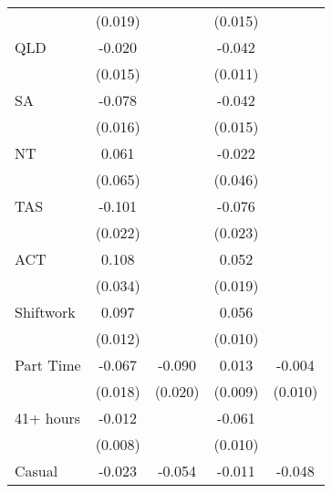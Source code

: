 {\begin{tabular}{l*{4}{c}}
                    &     (0.019)         &                     &     (0.015)         &                     \\
QLD                 &      -0.020         &                     &      -0.042\sym{***}&                     \\
                    &     (0.015)         &                     &     (0.011)         &                     \\
SA                  &      -0.078\sym{***}&                     &      -0.042\sym{***}&                     \\
                    &     (0.016)         &                     &     (0.015)         &                     \\
NT                  &       0.061         &                     &      -0.022         &                     \\
                    &     (0.065)         &                     &     (0.046)         &                     \\
TAS                 &      -0.101\sym{***}&                     &      -0.076\sym{***}&                     \\
                    &     (0.022)         &                     &     (0.023)         &                     \\
ACT                 &       0.108\sym{***}&                     &       0.052\sym{***}&                     \\
                    &     (0.034)         &                     &     (0.019)         &                     \\
Shiftwork           &       0.097\sym{***}&                     &       0.056\sym{***}&                     \\
                    &     (0.012)         &                     &     (0.010)         &                     \\
Part Time           &      -0.067\sym{***}&      -0.090\sym{***}&       0.013         &      -0.004         \\
                    &     (0.018)         &     (0.020)         &     (0.009)         &     (0.010)         \\
41+ hours           &      -0.012         &                     &      -0.061\sym{***}&                     \\
                    &     (0.008)         &                     &     (0.010)         &                     \\
Casual              &      -0.023\sym{*}  &      -0.054\sym{***}&      -0.011         &      -0.048\sym{***}\\

\end{tabular}}
